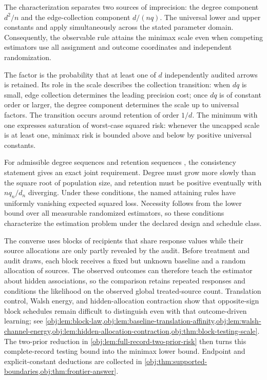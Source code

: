 \documentclass[11pt]{article}
\begin{document}
The characterization separates two sources of imprecision: the degree component \(d^2/n\) and the edge-collection component \(d/(nq)\). The universal lower and upper constants  and  apply simultaneously across the stated parameter domain. Consequently, the observable rule attains the minimax scale even when competing estimators use all assignment and outcome coordinates and independent randomization.

The factor  is the probability that at least one of \(d\) independently audited arrows is retained. Its role in the scale describes the collection transition: when \(dq\) is small, edge collection determines the leading precision cost; once \(dq\) is of constant order or larger, the degree component determines the scale up to universal factors. The transition occurs around retention of order \(1/d\). The minimum with one expresses saturation of worst-case squared risk: whenever the uncapped scale is at least one, minimax risk is bounded above and below by positive universal constants.

For admissible degree sequences  and retention sequences , the consistency statement gives an exact joint requirement. Degree must grow more slowly than the square root of population size, and retention must be positive eventually with \(nq_n/d_n\) diverging. Under these conditions, the named attaining rules have uniformly vanishing expected squared loss. Necessity follows from the lower bound over all measurable randomized estimators, so these conditions characterize the estimation problem under the declared design and schedule class.

The converse uses blocks of recipients that share response values while their source allocations are only partly revealed by the audit. Before treatment and audit draws, each block receives a fixed but unknown baseline and a random allocation of sources. The observed outcomes can therefore teach the estimator about hidden associations, so the comparison retains repeated responses and conditions the likelihood on the observed global treated-source count. Translation control, Walsh energy, and hidden-allocation contraction show that opposite-sign block schedules remain difficult to distinguish even with that outcome-driven learning; see \cref{obj:lem:block-law,obj:lem:baseline-translation-affinity,obj:lem:walsh-channel-energy,obj:lem:hidden-allocation-contraction,obj:thm:block-testing-scale}. The two-prior reduction in \cref{obj:lem:full-record-two-prior-risk} then turns this complete-record testing bound into the minimax lower bound. Endpoint and explicit-constant deductions are collected in \cref{obj:thm:supported-boundaries,obj:thm:frontier-answer}.
\end{document}
